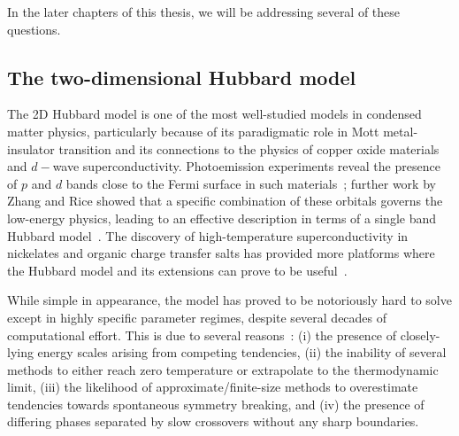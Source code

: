 In the later chapters of this thesis, we will be addressing several of these questions.

\subsection{The two-dimensional Hubbard model}
The 2D Hubbard model is one of the most well-studied models in condensed matter physics, particularly because of its paradigmatic role in Mott metal-insulator transition and its connections to the physics of copper oxide materials and \(d-\)wave superconductivity. Photoemission experiments reveal the presence of \(p\) and \(d\) bands close to the Fermi surface in such materials~\cite{Damascelli2003}; further work by Zhang and Rice showed that a specific combination of these orbitals governs the low-energy physics, leading to an effective description in terms of a single band Hubbard model~\cite{zhangrice-physrevb.37.3759}. The discovery of high-temperature superconductivity in nickelates and organic charge transfer salts has provided more platforms where the Hubbard model and its extensions can prove to be useful~\cite{Kitatani2020,Powell_2006}.

While simple in appearance, the model has proved to be notoriously hard to solve except in highly specific parameter regimes, despite several decades of computational effort. This is due to several reasons~\cite{qin2022}: (i) the presence of closely-lying energy scales arising from competing tendencies, (ii) the inability of several methods to either reach zero temperature or extrapolate to the thermodynamic limit, (iii) the likelihood of approximate/finite-size methods to overestimate tendencies towards spontaneous symmetry breaking, and (iv) the presence of differing phases separated by slow crossovers without any sharp boundaries.

